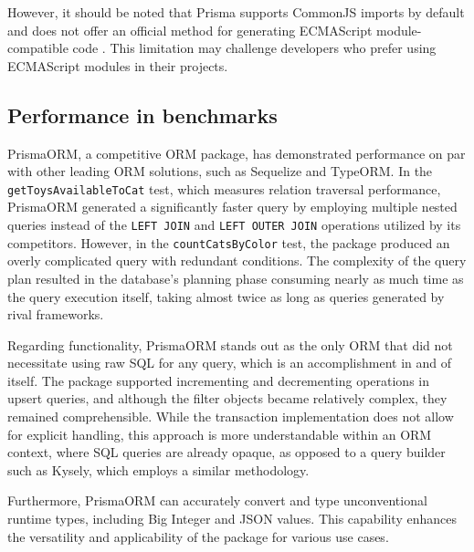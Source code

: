 However, it should be noted that Prisma supports CommonJS imports by default and
does not offer an official method for generating ECMAScript module-compatible
code \cite{prismaES6}. This limitation may challenge developers who prefer using
ECMAScript modules in their projects.

\subsection*{Performance in benchmarks}

PrismaORM, a competitive ORM package, has demonstrated performance on par with
other leading ORM solutions, such as Sequelize and TypeORM. In the
\texttt{getToysAvailableToCat} test, which measures relation traversal
performance, PrismaORM generated a significantly faster query by employing
multiple nested queries instead of the \texttt{LEFT JOIN} and \texttt{LEFT OUTER
JOIN} operations utilized by its competitors. However, in the
\texttt{countCatsByColor} test, the package produced an overly complicated query
with redundant conditions. The complexity of the query plan resulted in the
database's planning phase consuming nearly as much time as the query execution
itself, taking almost twice as long as queries generated by rival frameworks.

Regarding functionality, PrismaORM stands out as the only ORM that did not
necessitate using raw SQL for any query, which is an accomplishment in and of
itself. The package supported incrementing and decrementing operations in upsert
queries, and although the filter objects became relatively complex, they
remained comprehensible. While the transaction implementation does not allow for
explicit handling, this approach is more understandable within an ORM context,
where SQL queries are already opaque, as opposed to a query builder such as
Kysely, which employs a similar methodology.

Furthermore, PrismaORM can accurately convert and type unconventional runtime
types, including Big Integer and JSON values. This capability enhances the
versatility and applicability of the package for various use cases.
